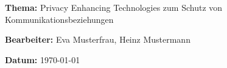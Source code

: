 \documentclass[fontsize=12pt,parskip=half]{scrartcl}
\begin{document}
\textbf{\textsf{Thema:}} Privacy Enhancing Technologies zum Schutz von Kommunikationsbeziehungen

\textbf{\textsf{Bearbeiter:}} Eva Musterfrau, Heinz Mustermann

\textbf{\textsf{Datum:}} \today
\nocite{*} %

\begin{raggedright}
  \printbibliography
\end{raggedright}
\end{document}

